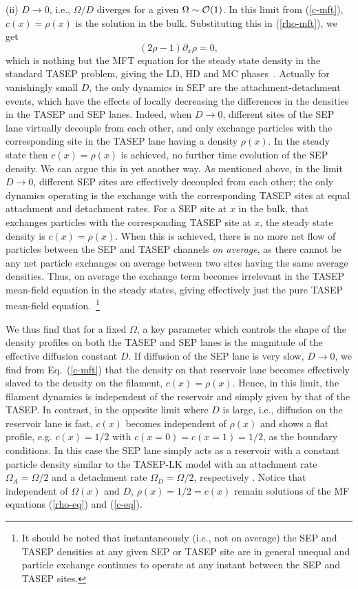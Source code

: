 \documentclass[aps,pre,twocolumn,superscriptaddress,amsmath,amssymb,longbibliography,floatfix,nofootinbib]{revtex4}
\begin{document}
(ii) $D\rightarrow 0$, i.e., $\Omega/D$ diverges for a given $\Omega\sim {\cal O}(1)$.  In this limit from (\ref{c-mft}), $c(x)=\rho(x)$ is the solution in the bulk. Substituting this in (\ref{rho-mft}), we get
\begin{equation}
 (2\rho-1)\partial_x\rho =0,
\end{equation}
which is nothing but the MFT equation for the steady state density in the standard TASEP problem, giving the LD, HD and MC phases~\cite{tasep-rev}. Actually for vanishingly small $D$, the only dynamics in SEP are the attachment-detachment events, which have the effects of locally decreasing the differences in the densities in the TASEP and SEP lanes. Indeed, when $D\rightarrow 0$, different sites of the SEP lane virtually decouple from each other, and only exchange particles with the corresponding site in the TASEP lane having a density $\rho(x)$. In the steady state then $c(x)=\rho(x)$ is achieved, no further time evolution of the SEP density. We can argue this in yet another way. As mentioned above, in the limit $D\rightarrow 0$, different SEP sites are effectively decoupled from each other; the only dynamics operating is the exchange with the corresponding TASEP sites at equal attachment and detachment rates. For a SEP site at $x$ in the bulk, that exchanges particles with the corresponding TASEP site at $x$, the steady state density is $c(x)=\rho(x)$. When this is achieved, there is no more net flow of particles between the SEP and TASEP channels {\em on average}, as there cannot be any net particle exchanges on average between two sites having the same average densities. Thus, on average the exchange term becomes irrelevant in the TASEP mean-field equation in the steady states, giving effectively just the pure TASEP mean-field equation.~\footnote{It should be noted that instantaneously (i.e., not on average) the SEP and TASEP densities at any given SEP or TASEP site are in general unequal and particle exchange continues to operate at any instant between the SEP and TASEP sites.}

We thus find that for a fixed $\Omega$, a key parameter which controls the shape of the density profiles on both the TASEP and SEP
lanes is the magnitude of the effective diffusion constant $D$. If diffusion
of the SEP lane is very slow, $D \to 0$, we find from Eq.~(\ref{c-mft}) that 
the density on that reservoir lane becomes effectively slaved to the density on the 
filament, $c(x)=\rho(x)$. Hence, in this limit, the filament dynamics is
independent of the reservoir and simply given by that of the TASEP. 
In contrast, in the opposite limit where $D$ is large, i.e., diffusion on
the reservoir lane is fast, $c(x)$ becomes independent of $\rho(x)$ and
shows a flat profile, e.g. $c(x)=1/2$ with $c(x=0)=c(x=1)=1/2$, as the boundary conditions. In this case the
SEP lane simply acts as a reservoir with a constant particle density
similar to the TASEP-LK model with an attachment rate $\Omega_A = \Omega/2$
and a detachment rate $\Omega_D = \Omega/2$, respectively \cite{frey-lktasep}. Notice that independent of $\Omega(x)$ and $D$, $\rho(x)=1/2=c(x)$ remain solutions of the MF equations (\ref{rho-eq}) and (\ref{c-eq}).
\end{document}
